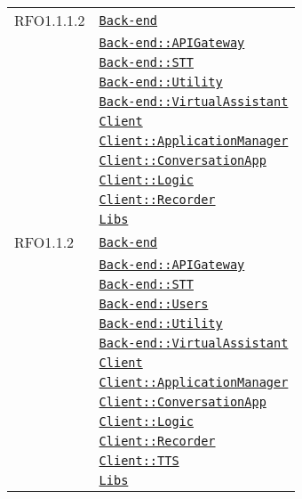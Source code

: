 \begin{longtable}{|>{\centering}m{3cm}|m{10cm}<{\centering}|}
RFO1.1.1.2 & \hyperref[Back-end]{\texttt{Back-end}}\\
& \hyperref[Back-end::APIGateway]{\texttt{Back-end::APIGateway}}\\
& \hyperref[Back-end::STT]{\texttt{Back-end::STT}}\\
& \hyperref[Back-end::Utility]{\texttt{Back-end::Utility}}\\
& \hyperref[Back-end::VirtualAssistant]{\texttt{Back-end::VirtualAssistant}}\\
& \hyperref[Client]{\texttt{Client}}\\
& \hyperref[Client::ApplicationManager]{\texttt{Client::ApplicationManager}}\\
& \hyperref[Client::ConversationApp]{\texttt{Client::ConversationApp}}\\
& \hyperref[Client::Logic]{\texttt{Client::Logic}}\\
& \hyperref[Client::Recorder]{\texttt{Client::Recorder}}\\
& \hyperref[Libs]{\texttt{Libs}}\\ \hline

RFO1.1.2 & \hyperref[Back-end]{\texttt{Back-end}}\\
& \hyperref[Back-end::APIGateway]{\texttt{Back-end::APIGateway}}\\
& \hyperref[Back-end::STT]{\texttt{Back-end::STT}}\\
& \hyperref[Back-end::Users]{\texttt{Back-end::Users}}\\
& \hyperref[Back-end::Utility]{\texttt{Back-end::Utility}}\\
& \hyperref[Back-end::VirtualAssistant]{\texttt{Back-end::VirtualAssistant}}\\
& \hyperref[Client]{\texttt{Client}}\\
& \hyperref[Client::ApplicationManager]{\texttt{Client::ApplicationManager}}\\
& \hyperref[Client::ConversationApp]{\texttt{Client::ConversationApp}}\\
& \hyperref[Client::Logic]{\texttt{Client::Logic}}\\
& \hyperref[Client::Recorder]{\texttt{Client::Recorder}}\\
& \hyperref[Client::TTS]{\texttt{Client::TTS}}\\
& \hyperref[Libs]{\texttt{Libs}}\\ \hline


\end{longtable}
